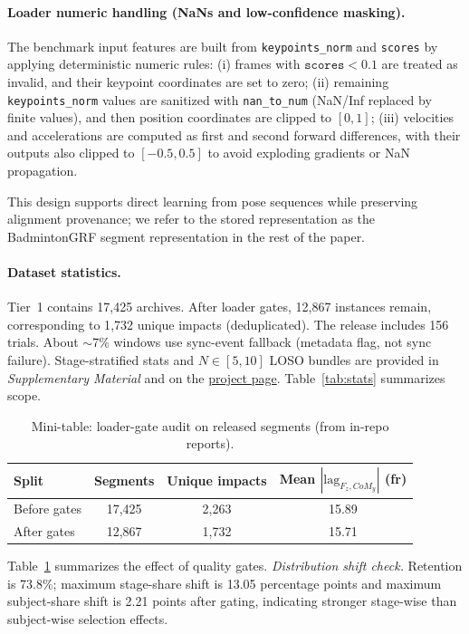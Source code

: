 \documentclass[sigconf,screen]{acmart}
\newcommand{\BadmintonGRFGitHubBase}{https://github.com/KenyaNiu/BadmintonGRF}
\newcommand{\BadmintonGRFRepoShort}{\href{\BadmintonGRFGitHubBase}{project page}}
\newcommand{\BadmintonGRFSupplementary}{\emph{Supplementary Material}}
\begin{document}
\paragraph{Loader numeric handling (NaNs and low-confidence masking).}
The benchmark input features are built from \texttt{keypoints\_norm} and \texttt{scores} by applying deterministic numeric rules:
(i) frames with \(\texttt{scores}<0.1\) are treated as invalid, and their keypoint coordinates are set to zero;
(ii) remaining \texttt{keypoints\_norm} values are sanitized with \texttt{nan\_to\_num} (NaN/Inf replaced by finite values), and then position coordinates are clipped to \([0,1]\);
(iii) velocities and accelerations are computed as first and second forward differences, with their outputs also clipped to \([-0.5,0.5]\) to avoid exploding gradients or NaN propagation.

This design supports direct learning from pose sequences while preserving alignment provenance; we refer to the stored representation as the BadmintonGRF segment representation in the rest of the paper.

\fi
\paragraph{Dataset statistics.}
Tier~1 contains 17{,}425 archives. After loader gates, 12{,}867 instances remain, corresponding to 1{,}732 unique impacts (deduplicated). The release includes 156 trials. About \(\sim\)7\% windows use sync-event fallback (metadata flag, not sync failure). Stage-stratified stats and $N\!\in\![5,10]$ LOSO bundles are provided in \BadmintonGRFSupplementary{} and on the \BadmintonGRFRepoShort. Table~\ref{tab:stats} summarizes scope.

\begin{table}[t]
  \centering
  \small
  \setlength{\tabcolsep}{4pt}
  \renewcommand{\arraystretch}{1.05}
  \caption{Mini-table: loader-gate audit on released segments (from in-repo reports).}
  \label{tab:filter_audit}
  \begin{tabular}{@{}lccc@{}}
    \toprule
    Split & Segments & Unique impacts & Mean $|\mathrm{lag}_{F_z,CoM_y}|$ (fr) \\
    \midrule
    Before gates & 17{,}425 & 2{,}263 & 15.89 \\
    After gates & 12{,}867 & 1{,}732 & 15.71 \\
    \bottomrule
  \end{tabular}
\end{table}
\noindent Table~\ref{tab:filter_audit} summarizes the effect of quality gates. \emph{Distribution shift check.} Retention is 73.8\%; maximum stage-share shift is 13.05 percentage points and maximum subject-share shift is 2.21 points after gating, indicating stronger stage-wise than subject-wise selection effects.
\end{document}
